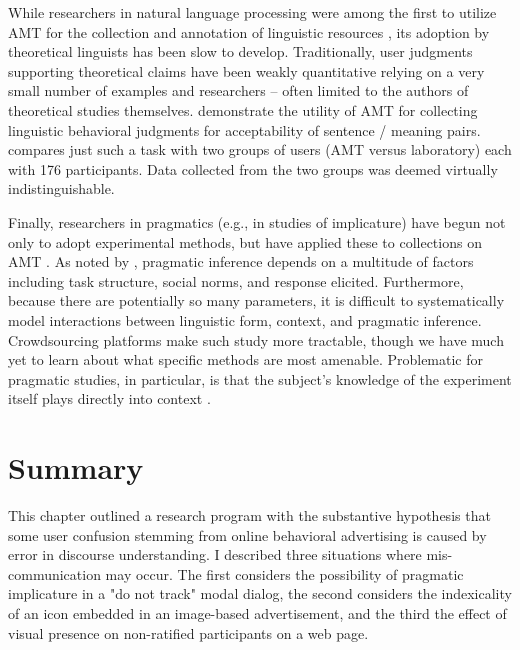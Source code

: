 \begin{sloppier}
While researchers in natural language processing were among the first to utilize AMT for the collection and annotation of linguistic resources \citep{CallisonBurch:2010vk}, its adoption by theoretical linguists has been slow to develop. Traditionally, user judgments supporting theoretical claims have been weakly quantitative relying on a very small number of examples and researchers -- often limited to the authors of theoretical studies themselves. \cite*{Gibson:2011wp} demonstrate the utility of AMT for collecting linguistic behavioral judgments for acceptability of sentence / meaning pairs. \cite{Sprouse:2010dx} compares just such a task with two groups of users (AMT versus laboratory) each with 176 participants. Data collected from the two groups was deemed virtually indistinguishable.
\end{sloppier}

Finally, researchers in pragmatics (e.g., in studies of implicature) have begun not only to adopt experimental methods, but have applied these to collections on AMT  \citep[for example,][]{Stiller:2011vz,Degen:tr,Bergen:2012up}.  As noted by  \cite*{Assessingthepragma:2011ug},  pragmatic inference depends on a multitude of factors including task structure, social norms, and response elicited. Furthermore, because there are potentially so many parameters, it is difficult to systematically model interactions between linguistic form, context, and pragmatic inference. Crowdsourcing platforms make such study more tractable, though we have much yet to learn about what specific methods are most amenable. Problematic for pragmatic studies, in particular, is that the subject's knowledge of the experiment itself plays directly into context  \citep{Rosnow:1976wy}. 

\section{Summary}
\label{summary}


\begin{sloppier}
This chapter outlined a research program with the substantive hypothesis that some user confusion stemming from online behavioral advertising is caused by error in discourse understanding. I described three situations where mis-communication may occur. The first considers the possibility of pragmatic implicature in a "do not track" modal dialog, the second considers the indexicality of an icon embedded in an image-based advertisement, and the third the effect of visual presence on non-ratified participants on a web page.
\end{sloppier}


